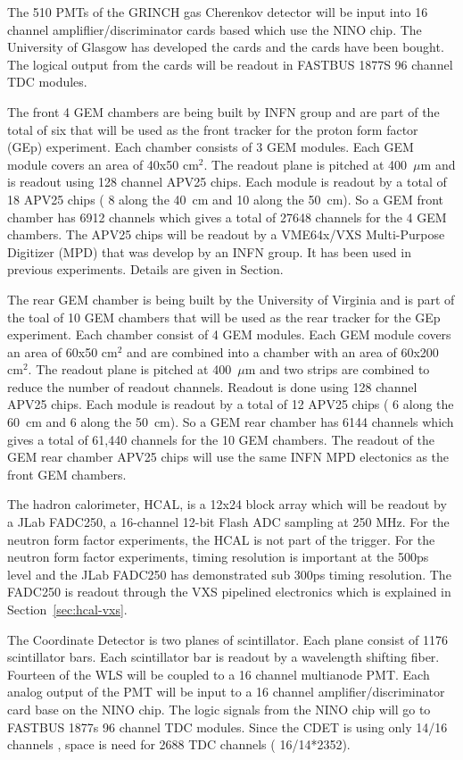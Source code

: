 \documentclass{article}
\begin{document}
The 510 PMTs of the GRINCH gas Cherenkov detector will be input into 16 channel ampliflier/discriminator
cards based which use the NINO chip. The University of Glasgow has developed the cards and the cards have 
been bought. The logical output from the cards will be readout in FASTBUS 1877S 96 channel TDC modules.

The front 4 GEM chambers are being built by INFN group and are part of the total of six that
will be used as the front tracker for the proton form factor (GEp) experiment. Each chamber consists
of 3 GEM modules. Each GEM module covers an area of 40x50 cm$^2$. The readout plane is pitched at 400~$\mu$m
and is readout using 128 channel APV25 chips. Each module is readout by a total of 18 APV25 chips ( 8 along
the 40~cm and 10 along the 50~cm). So a GEM front chamber has 6912 channels which gives a total of 27648 channels
for the 4 GEM chambers. The APV25 chips will be readout by a VME64x/VXS Multi-Purpose Digitizer (MPD) that was
develop by an INFN group. It has been used in previous experiments. Details are given in Section.

The rear GEM chamber is being built by the University of Virginia and is part of the toal of 10 GEM chambers
that will be used as the rear tracker for the GEp experiment. Each chamber consist of 4 GEM modules.
 Each GEM module covers an area of 60x50 cm$^2$ and are combined into a chamber with an area
of 60x200 cm$^2$. The readout plane is pitched at 400~$\mu$m and two strips are combined to reduce
the number of readout channels. Readout is done using 128 channel APV25 chips. Each module is readout 
by a total of  12 APV25 chips (  6 along the 60~cm and 6 along the 50~cm). So a GEM rear chamber has  
6144 channels which gives a total of 61,440 channels for the 10 GEM chambers. The readout of the GEM
rear chamber APV25 chips will use the same INFN MPD electonics as the front GEM chambers.  
 
The hadron calorimeter, HCAL, is a 12x24 block array which will be readout 
by a JLab FADC250, a 16-channel 12-bit Flash 
ADC sampling at 250 MHz. For the neutron form factor experiments, the HCAL is not part of the trigger. For the
neutron form factor experiments, timing resolution is important at the 500ps level and the JLab FADC250 has 
demonstrated sub 300ps timing resolution. The FADC250 is readout through the VXS pipelined electronics
which is explained in Section~\ref{sec:hcal-vxs}.


The Coordinate Detector is  two planes of scintillator. Each plane consist of 1176 scintillator bars. 
Each scintillator bar is readout by a wavelength shifting fiber. Fourteen of the WLS  will be coupled to
a 16 channel multianode PMT. Each analog output of the PMT will be input to a 16 channel amplifier/discriminator
card base on the NINO chip. The logic signals from the NINO chip will go to FASTBUS 1877s 96 channel TDC modules.
Since the CDET is using only 14/16 channels , space is need for 2688 TDC channels ( 16/14*2352).
 
\end{document}
